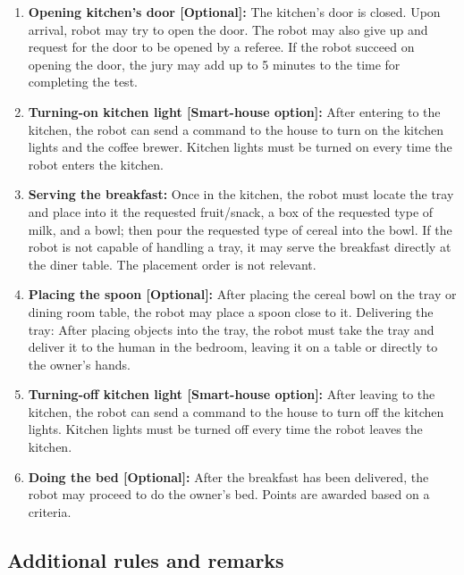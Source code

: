 \begin{enumerate}
\item \textbf{Opening kitchen's door [Optional]:} The kitchen's door is closed. Upon arrival, robot may try to open the door. The robot may also give up and request for the door to be opened by a referee. If the robot succeed on opening the door, the jury may add up to 5 minutes to the time for completing the test.

\item \textbf{Turning-on kitchen light [Smart-house option]:} After entering to the kitchen, the robot can send a command to the house to turn on the kitchen lights and the coffee brewer. Kitchen lights must be turned on every time the robot enters the kitchen.

\item \textbf{Serving the breakfast:} Once in the kitchen, the robot must locate the tray and place into it the requested fruit/snack, a box of the requested type of milk, and a bowl; then pour the requested type of cereal into the bowl. If the robot is not capable of handling a tray, it may serve the breakfast directly at the diner table. The placement order is not relevant.

\item \textbf{Placing the spoon [Optional]:} After placing the cereal bowl on the tray or dining room table, the robot may place a spoon close to it.
Delivering the tray: After placing objects into the tray, the robot must take the tray and deliver it to the human in the bedroom, leaving it on a table or directly to the owner's hands.

\item \textbf{Turning-off kitchen light [Smart-house option]:} After leaving to the kitchen, the robot can send a command to the house to turn off the kitchen lights. Kitchen lights must be turned off every time the robot leaves the kitchen.

\item \textbf{Doing the bed [Optional]:} After the breakfast has been delivered, the robot may proceed to do the owner's bed. Points are awarded based on a  criteria.

\end{enumerate}

\subsection{Additional rules and remarks}

